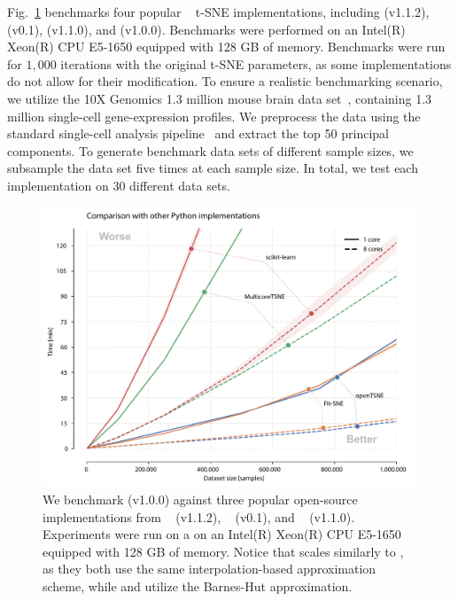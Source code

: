 \documentclass[article]{jss}
\newcommand{\opentsne}{\pkg{openTSNE}\xspace}
\begin{document}
Fig.~\ref{fig:benchmarks_py} benchmarks four popular ~\citep{vanrossum1995python} t-SNE implementations, including  (v1.1.2),  (v0.1),  (v1.1.0), and \opentsne (v1.0.0). Benchmarks were performed on an Intel(R) Xeon(R) CPU E5-1650 equipped with 128 GB of memory. Benchmarks were run for $1,000$ iterations with the original t-SNE parameters, as some implementations do not allow for their modification. To ensure a realistic benchmarking scenario, we utilize the 10X Genomics 1.3 million mouse brain data set~\citep{cao2019single}, containing 1.3 million single-cell gene-expression profiles. We preprocess the data using the standard single-cell analysis pipeline~\citep{kiselev2019challenges} and extract the top 50 principal components. To generate benchmark data sets of different sample sizes, we subsample the data set five times at each sample size. In total, we test each implementation on 30 different data sets.

\begin{figure}[ht]
  \centering
  \includegraphics{benchmarks_python-final}
  \caption{\label{fig:benchmarks_py}
  We benchmark \opentsne (v1.0.0) against three popular open-source
  implementations from ~\citep{pedregosa2011scikit}
  (v1.1.2), ~\citep{Ulyanov2016} (v0.1), and
  ~\citep{linderman2019fast} (v1.1.0). Experiments were run on a
  on an Intel(R) Xeon(R) CPU E5-1650 equipped with 128 GB of memory. Notice
  that \opentsne scales similarly to , as they both use the
  same interpolation-based approximation scheme, while  and
   utilize the Barnes-Hut approximation.
}
\end{figure}
\end{document}
